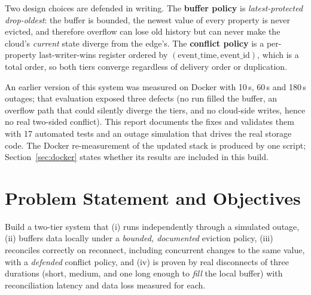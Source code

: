 \documentclass[11pt,a4paper]{article}
\begin{document}
Two design choices are defended in writing. The \textbf{buffer policy} is
\emph{latest-protected drop-oldest}: the buffer is bounded, the newest value of every property is
never evicted, and therefore overflow can lose old history but can never make the cloud's
\emph{current} state diverge from the edge's. The \textbf{conflict policy} is a per-property
last-writer-wins register ordered by $(\text{event\_time},\text{event\_id})$, which is a total order, so
both tiers converge regardless of delivery order or duplication.

An earlier version of this system was measured on Docker with 10\,s, 60\,s and 180\,s outages; that
evaluation exposed three defects (no run filled the buffer, an overflow path that could silently
diverge the tiers, and no cloud-side writes, hence no real two-sided conflict). This report
documents the fixes and validates them with 17 automated tests and an outage simulation that
drives the real storage code. The Docker re-measurement of the updated stack is produced by one
script; Section~\ref{sec:docker} states whether its results are included in this build.

\section{Problem Statement and Objectives}
Build a two-tier system that (i) runs independently through a simulated outage, (ii) buffers data
locally under a \emph{bounded, documented} eviction policy, (iii) reconciles correctly on reconnect,
including concurrent changes to the same value, with a \emph{defended} conflict policy, and
(iv) is proven by real disconnects of three durations (short, medium, and one long enough to
\emph{fill} the local buffer) with reconciliation latency and data loss measured for each.
\end{document}
